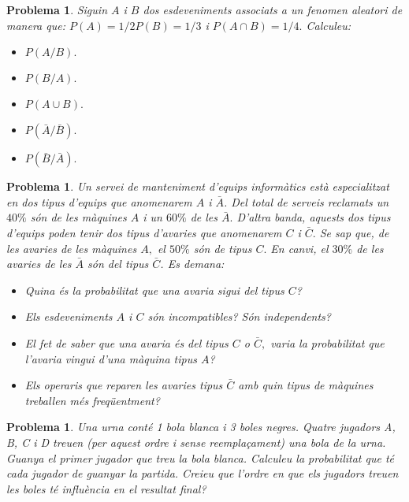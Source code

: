 \documentclass[11pt]{article}
\newcounter{prbcont}
\newtheorem{problema}[prbcont]{Problema}
\begin{document}
\begin{problema}
Siguin $A$ i $B$ dos esdeveniments associats a un fenomen aleatori de manera que: $P(A)=1/2 P(B) = 1/3$ i $P (A\cap B)= 1/4.$ Calculeu:
\begin{itemize}
\item [(a)] $ P(A/B).$
\item [(b)] $ P(B/A).$
\item [(c)] $ P(A\cup B).$
\item [(d)] $ P(\bar{A}/\bar{B}).$
\item [(e)] $ P(\bar{B}/\bar{A}).$ %
\end{itemize}
\end{problema}

\begin{problema}
Un servei de manteniment d'equips inform\`atics est\`a especialitzat en dos tipus d'equips que anomenarem $A$ i $\bar{A}$. Del total de serveis reclamats un $40\%$ s\'on de les m\`aquines $A$ i un $60\%$ de les $\bar{A}.$ D'altra banda, aquests dos tipus d'equips poden tenir dos tipus d'avaries que anomenarem $C$ i $\bar{C}.$ Se sap que, de les avaries de les m\`aquines $A,$ el $50\%$ s\'on de tipus $C.$ En canvi, el $30\%$ de les avaries de les $\bar{A}$ s\'on del tipus $\bar{C}$. Es demana:
\begin{itemize}
\item [(a)] Quina \'es la probabilitat que una avaria sigui del tipus $C$? %
\item [(b)] Els esdeveniments $A$ i $C$ s\'on incompatibles? S\'on independents? %
\item [(c)] El fet de saber que una avaria \'es del tipus $C$ o $\bar{C},$ varia la probabilitat que l'avaria vingui d'una m\`aquina tipus $A$?
\item [(d)] Els operaris que reparen les avaries tipus $\bar{C}$ amb quin tipus de m\`aquines treballen m\'es freq\"uentment?
\end{itemize}
\end{problema}

\begin{problema}
Una urna cont\'e 1 bola blanca i 3 boles negres. Quatre jugadors A, B, C i D treuen (per aquest ordre i sense reempla\c{c}ament) una bola de la urna. Guanya el primer jugador que treu la bola blanca. Calculeu la probabilitat que t\'e cada jugador de guanyar la partida. Creieu que l'ordre en que els jugadors treuen les boles t\'e influ\`encia en el resultat final? %
\end{problema}
\end{document}

